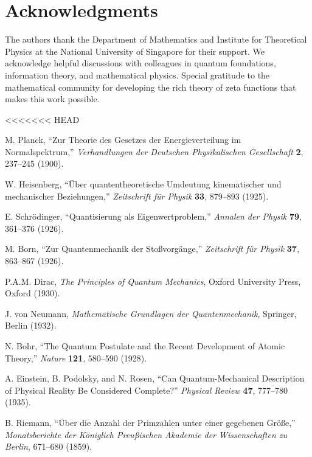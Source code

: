 \documentclass[11pt]{article}
\theoremstyle{plain}
\theoremstyle{definition}
\theoremstyle{remark}
\begin{document}
\section*{Acknowledgments}

The authors thank the Department of Mathematics and Institute for Theoretical Physics at the National University of Singapore for their support. We acknowledge helpful discussions with colleagues in quantum foundations, information theory, and mathematical physics. Special gratitude to the mathematical community for developing the rich theory of zeta functions that makes this work possible.


<<<<<<< HEAD

\begin{thebibliography}{99}

 M. Planck, ``Zur Theorie des Gesetzes der Energieverteilung im Normalspektrum,'' \emph{Verhandlungen der Deutschen Physikalischen Gesellschaft} \textbf{2}, 237--245 (1900).

 W. Heisenberg, ``Über quantentheoretische Umdeutung kinematischer und mechanischer Beziehungen,'' \emph{Zeitschrift für Physik} \textbf{33}, 879--893 (1925).

 E. Schrödinger, ``Quantisierung als Eigenwertproblem,'' \emph{Annalen der Physik} \textbf{79}, 361--376 (1926).

 M. Born, ``Zur Quantenmechanik der Stoßvorgänge,'' \emph{Zeitschrift für Physik} \textbf{37}, 863--867 (1926).

 P.A.M. Dirac, \emph{The Principles of Quantum Mechanics}, Oxford University Press, Oxford (1930).

 J. von Neumann, \emph{Mathematische Grundlagen der Quantenmechanik}, Springer, Berlin (1932).

 N. Bohr, ``The Quantum Postulate and the Recent Development of Atomic Theory,'' \emph{Nature} \textbf{121}, 580--590 (1928).

 A. Einstein, B. Podolsky, and N. Rosen, ``Can Quantum-Mechanical Description of Physical Reality Be Considered Complete?'' \emph{Physical Review} \textbf{47}, 777--780 (1935).

 B. Riemann, ``Über die Anzahl der Primzahlen unter einer gegebenen Größe,'' \emph{Monatsberichte der Königlich Preußischen Akademie der Wissenschaften zu Berlin}, 671--680 (1859).


\end{thebibliography}
\end{document}
